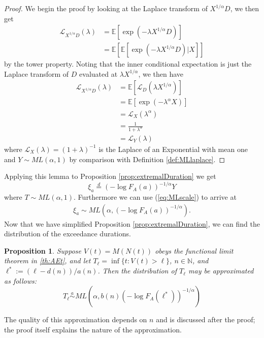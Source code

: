 \documentclass[honours,12pt,twoside, openright]{unswthesis}
\newcommand{\E}{\mathbb{E}}
\newcommand{\1}{\mathbf 1}
\newtheorem{proposition}[equation]{Proposition}
\numberwithin{equation}{section}
\theoremstyle{definition}
\theoremstyle{remark}
\begin{document}
\begin{proof}
We begin the proof by looking at the Laplace transform of $X^{1/\alpha}D$, we then get
\begin{align*}
\mathcal{L}_{X^{1/\alpha}D}(\lambda)&=\E[\exp(-\lambda X^{1/\alpha}D)]\\
									 &=\E[\E[\exp(-\lambda X^{1/\alpha}D)|X]]
\end{align*}
by the tower property. Noting that the inner conditional expectation is just the Laplace transform of $D$ evaluated at $\lambda X^{1/\alpha}$, we then have
\begin{align*}
\mathcal{L}_{X^{1/\alpha}D}(\lambda)&=\E[\mathcal{L}_D(\lambda X^{1/\alpha})]\\
									 &=\E[\exp(-\lambda^\alpha X)]\\
									 &=\mathcal{L}_X(\lambda^\alpha)\\
									 &=\frac{1}{1+\lambda^\alpha}\\
									 &=\mathcal{L}_Y(\lambda)
\end{align*}
where $\mathcal{L}_X(\lambda)=(1+\lambda)^{-1}$ is the Laplace of an Exponential with mean one and $Y\sim ML(\alpha,1)$ by comparison with Definition \ref{def:MLlaplace}.
\end{proof}
\noindent Applying this lemma to Proposition \ref{prop:extremalDuration} we get
\[
	\xi_a \overset{d}{=} (-\log F_A(a))^{-1/\alpha}Y
\]
where $T\sim ML(\alpha,1)$. Furthermore we can use (\ref{eq:MLscale}) to arrive at
\begin{align}\label{eq:extremalDurationFinal}
 	\xi_a \sim ML\left(\alpha,(-\log F_A(a))^{-1/\alpha}\right).
\end{align}
Now that we have simplified Proposition \ref{prop:extremalDuration}, we can find the distribution of the exceedance durations.

\begin{proposition}\label{th:MLdist}
Suppose $V(t)=M(N(t))$ obeys the functional limit theorem in \ref{th:AEt}, and let 
$T_\ell=\inf\{t: V(t) > \ell\}$, 
$n \in \mathbb N$, 
and $\ell^* := (\ell - d(n))/ a(n)$. 
Then the distribution of $T_\ell$ may be approximated as follows: 
	\[ \label{eq:distT}
		T_\ell\overset{a}{\sim}ML\left(\alpha, b(n)(-\log F_A(\ell^*))^{-1/\alpha}\right)
	\]
\end{proposition}

The quality of this approximation depends on $n$ and is discussed after 
the proof; the proof itself explains the nature of the approximation.
\end{document}
